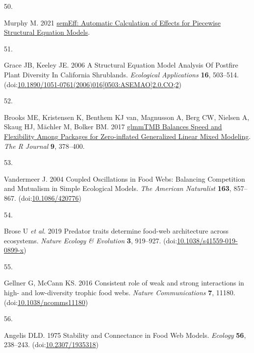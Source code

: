 \documentclass[
]{article}
\newlength{\cslhangindent}
\newlength{\csllabelwidth}
\newlength{\cslentryspacingunit} %
\newenvironment{CSLReferences}[2] %
 {%
  \setlength{\parindent}{0pt}
  \ifodd #1
  \let\oldpar\par
  \def\par{\hangindent=\cslhangindent\oldpar}
  \fi
  \setlength{\parskip}{#2\cslentryspacingunit}
 }%
 {}
\newcommand{\CSLLeftMargin}[1]{\parbox[t]{\csllabelwidth}{#1}}
\newcommand{\CSLRightInline}[1]{\parbox[t]{\linewidth - \csllabelwidth}{#1}\break}
\begin{document}
\begin{CSLReferences}{0}{0}
\leavevmode{}%
\CSLLeftMargin{50. }%
\CSLRightInline{Murphy M. 2021 \href{https://CRAN.R-project.org/package=semEff}{{semEff}: {Automatic} {Calculation} of {Effects} for {Piecewise} {Structural} {Equation} {Models}}. }

\leavevmode{}%
\CSLLeftMargin{51. }%
\CSLRightInline{Grace JB, Keeley JE. 2006 A {Structural} {Equation} {Model} {Analysis} {Of} {Postfire} {Plant} {Diversity} {In} {California} {Shrublands}. \emph{Ecological Applications} \textbf{16}, 503--514. (doi:\href{https://doi.org/10.1890/1051-0761(2006)016\%5B0503:ASEMAO\%5D2.0.CO;2}{10.1890/1051-0761(2006)016{[}0503:ASEMAO{]}2.0.CO;2})}

\leavevmode{}%
\CSLLeftMargin{52. }%
\CSLRightInline{Brooks ME, Kristensen K, Benthem KJ van, Magnusson A, Berg CW, Nielsen A, Skaug HJ, Mächler M, Bolker BM. 2017 \href{https://journal.r-project.org/archive/2017/RJ-2017-066/index.html}{{glmmTMB} {Balances} {Speed} and {Flexibility} {Among} {Packages} for {Zero}-inflated {Generalized} {Linear} {Mixed} {Modeling}}. \emph{The R Journal} \textbf{9}, 378--400.}

\leavevmode{}%
\CSLLeftMargin{53. }%
\CSLRightInline{Vandermeer J. 2004 Coupled {Oscillations} in {Food} {Webs}: {Balancing} {Competition} and {Mutualism} in {Simple} {Ecological} {Models}. \emph{The American Naturalist} \textbf{163}, 857--867. (doi:\href{https://doi.org/10.1086/420776}{10.1086/420776})}

\leavevmode{}%
\CSLLeftMargin{54. }%
\CSLRightInline{Brose U \emph{et al.} 2019 Predator traits determine food-web architecture across ecosystems. \emph{Nature Ecology \& Evolution} \textbf{3}, 919--927. (doi:\href{https://doi.org/10.1038/s41559-019-0899-x}{10.1038/s41559-019-0899-x})}

\leavevmode{}%
\CSLLeftMargin{55. }%
\CSLRightInline{Gellner G, McCann KS. 2016 Consistent role of weak and strong interactions in high- and low-diversity trophic food webs. \emph{Nature Communications} \textbf{7}, 11180. (doi:\href{https://doi.org/10.1038/ncomms11180}{10.1038/ncomms11180})}

\leavevmode{}%
\CSLLeftMargin{56. }%
\CSLRightInline{Angelis DLD. 1975 Stability and {Connectance} in {Food} {Web} {Models}. \emph{Ecology} \textbf{56}, 238--243. (doi:\href{https://doi.org/10.2307/1935318}{10.2307/1935318})}


\end{CSLReferences}
\end{document}
